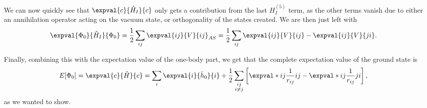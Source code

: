 We can now quickly see that $\expval{c}{\hat{H}_I}{c}$ only gets a contribution from the last $H_I^{(5)}$ term, as the other terms vanish due to either an annihilation operator acting on the vacuum state, or orthogonality of the states created.
We are then just left with
\begin{equation}
    \expval{\Phi_0}{\hat{H}_I}{\Phi_0} = \frac{1}{2} \sum_{ij} \expval{ij}{V}{ij}_{AS} = \frac{1}{2} \sum_{ij} \expval{ij}{V}{ij} - \expval{ij}{V}{ji}.
\end{equation}

Finally, combining this with the expectation value of the one-body part, we get that the complete expectation value of the ground state is
\begin{equation}
    E[\Phi_0]
    = \expval{c}{\hat{H}}{c}
    = \sum_{i} \expval{i}{\hat{h}_0}{i} + \frac{1}{2} \sum_{\substack{ij \\ i \neq j}} \left[\expval*{ij}{\frac{1}{r_{ij}}}{ij} - \expval*{ij}{\frac{1}{r_{ij}}}{ji}\right],
\end{equation}
as we wanted to show.

